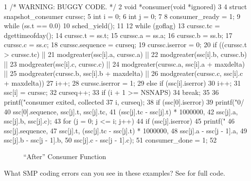 { \fontsize{6.5pt}{7.5pt}\selectfont
\begin{verbbox}
  1 /* WARNING: BUGGY CODE. */
  2 void *consumer(void *ignored)
  3 {
  4   struct snapshot_consumer curssc;
  5   int i = 0;
  6   int j = 0;
  7
  8   consumer_ready = 1;
  9   while (ss.t == 0.0) {
 10     sched_yield();
 11   }
 12   while (goflag) {
 13     curssc.tc = dgettimeofday();
 14     curssc.t = ss.t;
 15     curssc.a = ss.a;
 16     curssc.b = ss.b;
 17     curssc.c = ss.c;
 18     curssc.sequence = curseq;
 19     curssc.iserror = 0;
 20     if ((curssc.t > curssc.tc) ||
 21         modgreater(ssc[i].a, curssc.a) ||
 22         modgreater(ssc[i].b, curssc.b) ||
 23         modgreater(ssc[i].c, curssc.c) ||
 24         modgreater(curssc.a, ssc[i].a + maxdelta) ||
 25         modgreater(curssc.b, ssc[i].b + maxdelta) ||
 26         modgreater(curssc.c, ssc[i].c + maxdelta)) {
 27       i++;
 28       curssc.iserror = 1;
 29     } else if (ssc[i].iserror)
 30       i++;
 31     ssc[i] = curssc;
 32     curseq++;
 33     if (i + 1 >= NSNAPS)
 34       break;
 35   }
 36   printf("consumer exited, collected %
 37          i, curseq);
 38   if (ssc[0].iserror)
 39     printf("0/%
 40            ssc[0].sequence, ssc[j].t, ssc[j].tc,
 41            (ssc[j].tc - ssc[j].t) * 1000000,
 42            ssc[j].a, ssc[j].b, ssc[j].c);
 43   for (j = 0; j <= i; j++)
 44     if (ssc[j].iserror)
 45       printf("%
 46              ssc[j].sequence,
 47              ssc[j].t, (ssc[j].tc - ssc[j].t) * 1000000,
 48              ssc[j].a - ssc[j - 1].a,
 49              ssc[j].b - ssc[j - 1].b,
 50              ssc[j].c - ssc[j - 1].c);
 51   consumer_done = 1;
 52 }
\end{verbbox}
}
\begin{figure}[htbp]
\centering
\theverbbox
\caption{``After'' Consumer Function}
\label{fig:app:questions:After Consumer Function}
\end{figure}

\QuickQuiz{}
	What SMP coding errors can you see in these examples?
	See  for full code.
 \QuickQuizEnd

